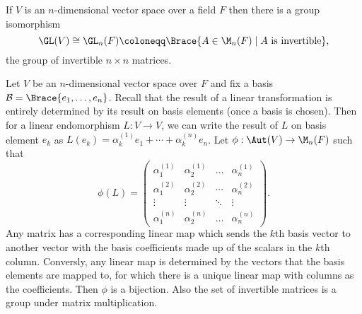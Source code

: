 \documentclass[../Project.tex]{subfiles}
\begin{document}
\begin{prop}
	 If $V$ is an $n$-dimensional vector space over a field $F$ then there is a group isomorphism
	$$\GL(V) \cong \GL_n(F) \coloneqq \Brace{A \in \M_n(F) \;|\; A \text{ is invertible}},$$
	the group of invertible $n \times n$ matrices.
\end{prop}
\begin{proo*}
	Let $V$ be an $n$-dimensional vector space over $F$ and fix a basis $\mathcal{B} = \Brace{e_1,\dots,e_n}$. Recall that the result of a linear transformation is entirely determined by its result on basis elements (once a basis is chosen). Then for a linear endomorphism $L : V \to V$, we can write the result of $L$ on basis element $e_k$ as $L(e_k) = \alpha^{(1)}_ke_1 + \cdots + \alpha^{(n)}_ke_n$. Let $\phi : \Aut(V) \to \M_n(F)$ such that
	$$\phi(L) =
	\begin{pmatrix} 
	    \alpha^{(1)}_1 & \alpha^{(1)}_2 & \dots & \alpha^{(1)}_n \\
	    \alpha^{(2)}_1 & \alpha^{(2)}_2 & \cdots & \alpha^{(2)}_n \\
	    \vdots & \vdots& \ddots & \vdots\\
	    \alpha^{(n)}_1 & \alpha^{(n)}_2  &\dots & \alpha^{(n)}_n 
	\end{pmatrix}.$$
	Any matrix has a corresponding linear map which sends the $k$th basis vector to another vector with the basis coefficients made up of the scalars in the $k$th column. Conversly, any linear map is determined by the vectors that the basis elements are mapped to, for which there is a unique linear map with columns as the coefficients. Then $\phi$ is a bijection. Also the set of invertible matrices is a group under matrix multiplication.  \\


\end{proo*}
\end{document}
